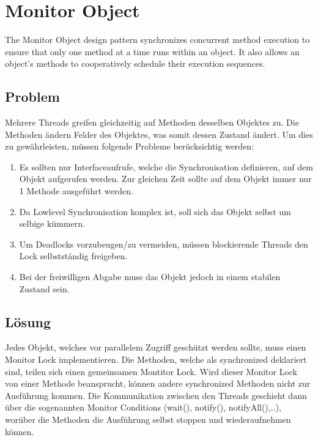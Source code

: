\section{Monitor Object}


The Monitor Object design pattern synchronizes concurrent method
execution to ensure that only one method at a time runs within an
object. It also allows an object’s methods to cooperatively schedule
their execution sequences.

\subsection*{Problem}


Mehrere Threads greifen gleichzeitig auf Methoden desselben Objektes zu. Die Methoden ändern Felder des Objektes, was somit dessen Zustand ändert. Um dies zu gewährleisten, müssen folgende Probleme berücksichtig werden:


\begin{enumerate}
	\item Es sollten nur Interfaceaufrufe, welche die Synchronisation definieren, auf dem Objekt aufgerufen werden. Zur gleichen Zeit sollte auf dem Objekt immer nur 1 Methode ausgeführt werden.
	\item Da Lowlevel Synchronisation komplex ist, soll sich das Objekt selbst um selbige kümmern.
	\item Um Deadlocks vorzubeugen/zu vermeiden, müssen blockierende Threads den Lock selbstständig freigeben.
	\item Bei der freiwilligen Abgabe muss das Objekt jedoch in einem stabilen Zustand sein.
\end{enumerate}

\subsection*{Lösung}


Jedes Objekt, welches vor parallelem Zugriff geschützt werden sollte, muss einen Monitor Lock implementieren. Die Methoden, welche als synchronized deklariert sind, teilen sich einen gemeinsamen Montitor Lock. Wird dieser Monitor Lock von einer Methode beansprucht, können andere synchronized Methoden nicht zur Ausführung kommen. Die Kommunikation zwischen den Threads geschieht dann über die sogenannten Monitor Conditions (wait(), notify(), notifyAll(),..), worüber die Methoden die Ausführung selbst stoppen und wiederaufnehmen können.


